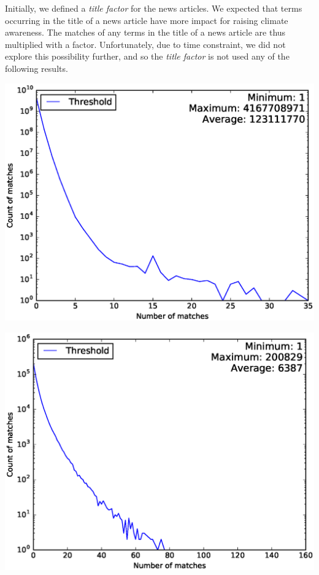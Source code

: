 \documentclass[paper=a4, fontsize=9px]{scrartcl} %
\numberwithin{equation}{section} %
\numberwithin{figure}{section} %
\numberwithin{table}{section} %
\newenvironment{Figure}
{\par\medskip\noindent\minipage{\linewidth}}
{\endminipage\par\medskip}
\begin{document}
\begin{multicols}{2}
Initially, we defined a \textit{title factor} for the news articles. We expected that terms occurring in the title of a news article have more impact for raising climate awareness. The matches of any terms in the title of a news article are thus multiplied with a factor. Unfortunately, due to time constraint, we did not explore this possibility further, and so the \textit{title factor} is not used any of the following results.

\begin{Figure}
	\includegraphics[width=\textwidth]{img/threshold_twitter_log_scale}
	\label{fig:1}
\end{Figure}

\begin{Figure}
	\includegraphics[width=\textwidth]{img/threshold_volkskrant_log_scale}
	\label{fig:2}
\end{Figure}


\end{multicols}
\end{document}
